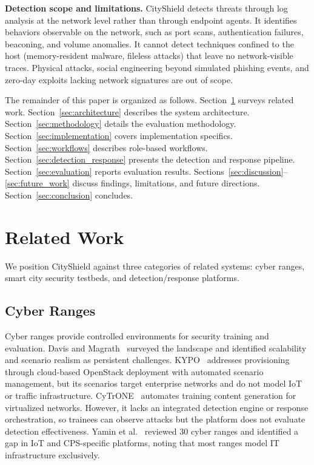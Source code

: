 \documentclass[conference,10pt]{IEEEtran}
\begin{document}
\textbf{Detection scope and limitations.} CityShield detects threats through log analysis at the network level rather than through endpoint agents. It identifies behaviors observable on the network, such as port scans, authentication failures, beaconing, and volume anomalies. It cannot detect techniques confined to the host (memory-resident malware, fileless attacks) that leave no network-visible traces. Physical attacks, social engineering beyond simulated phishing events, and zero-day exploits lacking network signatures are out of scope.

The remainder of this paper is organized as follows. Section~\ref{sec:related_work} surveys related work. Section~\ref{sec:architecture} describes the system architecture. Section~\ref{sec:methodology} details the evaluation methodology. Section~\ref{sec:implementation} covers implementation specifics. Section~\ref{sec:workflows} describes role-based workflows. Section~\ref{sec:detection_response} presents the detection and response pipeline. Section~\ref{sec:evaluation} reports evaluation results. Sections~\ref{sec:discussion}--\ref{sec:future_work} discuss findings, limitations, and future directions. Section~\ref{sec:conclusion} concludes.

\section{Related Work}
\label{sec:related_work}

We position CityShield against three categories of related systems: cyber ranges, smart city security testbeds, and detection/response platforms.

\subsection{Cyber Ranges}

Cyber ranges provide controlled environments for security training and evaluation. Davis and Magrath~\cite{davis2013survey} surveyed the landscape and identified scalability and scenario realism as persistent challenges. KYPO~\cite{vykopal2017kypo} addresses provisioning through cloud-based OpenStack deployment with automated scenario management, but its scenarios target enterprise networks and do not model IoT or traffic infrastructure. CyTrONE~\cite{beuran2018cytrone} automates training content generation for virtualized networks. However, it lacks an integrated detection engine or response orchestration, so trainees can observe attacks but the platform does not evaluate detection effectiveness. Yamin et al.~\cite{yamin2020cyber} reviewed 30 cyber ranges and identified a gap in IoT and CPS-specific platforms, noting that most ranges model IT infrastructure exclusively.
\end{document}
